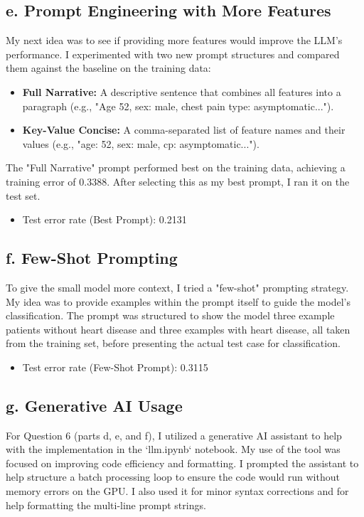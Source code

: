 \documentclass[11pt]{article}
\begin{document}
\subsection*{e. Prompt Engineering with More Features}

\noindent
My next idea was to see if providing more features would improve the LLM's performance. I experimented with two new prompt structures and compared them against the baseline on the training data:
\begin{itemize}
    \item \textbf{Full Narrative:} A descriptive sentence that combines all features into a paragraph (e.g., "Age 52, sex: male, chest pain type: asymptomatic...").
    \item \textbf{Key-Value Concise:} A comma-separated list of feature names and their values (e.g., "age: 52, sex: male, cp: asymptomatic...").
\end{itemize}
The "Full Narrative" prompt performed best on the training data, achieving a training error of 0.3388. After selecting this as my best prompt, I ran it on the test set.
\begin{itemize}
    \item Test error rate (Best Prompt): 0.2131
\end{itemize}

\subsection*{f. Few-Shot Prompting}

\noindent
To give the small model more context, I tried a "few-shot" prompting strategy. My idea was to provide examples within the prompt itself to guide the model's classification. The prompt was structured to show the model three example patients without heart disease and three examples with heart disease, all taken from the training set, before presenting the actual test case for classification.
\begin{itemize}
    \item Test error rate (Few-Shot Prompt): 0.3115
\end{itemize}

\subsection*{g. Generative AI Usage}

\noindent
For Question 6 (parts d, e, and f), I utilized a generative AI assistant to help with the implementation in the `llm.ipynb` notebook. My use of the tool was focused on improving code efficiency and formatting. I prompted the assistant to help structure a batch processing loop to ensure the code would run without memory errors on the GPU. I also used it for minor syntax corrections and for help formatting the multi-line prompt strings.
\end{document}
